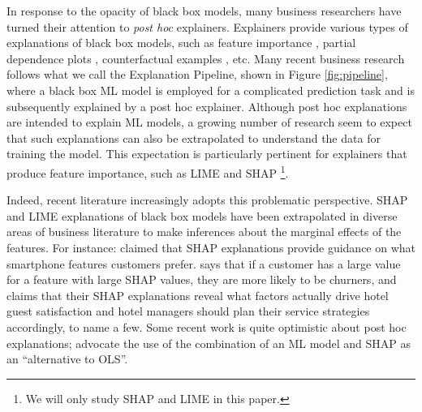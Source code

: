 \documentclass[mnsc,blindrev]{informs3}
\begin{document}
In response to the opacity of black box models, many business researchers have turned their attention to \emph{post hoc} explainers. Explainers provide various types of explanations of black box models, such as feature importance \citep{ribeiro16lime,lundberg17shap}, partial dependence plots \citep{friedman01pdp}, counterfactual examples \citep{mothilal20dice}, etc. Many recent business research follows what we call the Explanation Pipeline, shown in Figure \ref{fig:pipeline}, where a black box ML model is employed for a complicated prediction task and is subsequently explained by a post hoc explainer. %
Although post hoc explanations are intended to explain ML models, a growing number of research seem to expect that such explanations can also be extrapolated to understand the data for training the model. This expectation is particularly pertinent for explainers that produce feature importance, such as LIME \citep{ribeiro16lime} and SHAP \citep{lundberg17shap}\footnote{We will only study SHAP and LIME in this paper.}.


Indeed, recent literature increasingly adopts this problematic perspective. SHAP and LIME explanations of black box models have been extrapolated in diverse areas of business literature to make inferences about the marginal effects of the features. For instance: \cite{park2024extracting} claimed that SHAP explanations provide guidance on what smartphone features customers prefer.\cite{jiang24churn} says that if a customer has a large value for a feature with large SHAP values, they are more likely to be churners, and \cite{sanchez2023role} claims that their SHAP explanations reveal what factors actually drive hotel guest satisfaction and hotel managers should plan their service strategies accordingly, to name a few. Some recent work is quite optimistic about post hoc explanations; \citep{berger2023supply} advocate the use of the combination of an ML model and SHAP as an ``alternative to OLS''.
\end{document}
